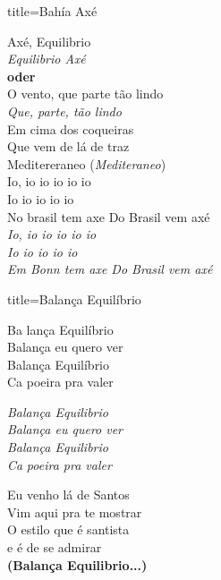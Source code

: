 \documentclass[fontsize=14pt, paper=a4, twoside, DIV=20]{scrreprt} %
\begin{document}
\begin{multicols*}{2}
\begin{song}{title={Bahía Axé}}
\begin{verse*}
        Axé, Equilibrio \\
        \textit{Equilibrio Axé} \\ 
        \textbf{oder} \\
        O vento, que parte tão lindo\\
        \textit{Que, parte, tão lindo}\\
        Em cima dos coqueiras\\
        Que vem de lá de traz\\
        Meditereraneo (\textit{Mediteraneo})\\
        Io, io io io io io\\
        Io io io io io\\
        No brasil tem axe Do Brasil vem axé\\
        \textit{Io, io io io io io}\\
        \textit{Io io io io io}\\
        \textit{Em Bonn tem axe Do Brasil vem axé}\\

    \end{verse*}
\end{song}


\begin{song}{title={Balança Equilíbrio}}
    \begin{verse*}
        Ba lança Equilíbrio\\
        Balança eu quero ver\\
        Balança Equilíbrio\\
        Ca poeira pra valer\\

        \begin{chorus*}
        \textit{Balança Equilibrio}\\
        \textit{Balança eu quero ver}\\
        \textit{Balança Equilibrio}\\
        \textit{Ca} \textit{poeira pra valer}\\
        \end{chorus*}
        
        Eu venho lá de Santos\\
        Vim aqui pra te mostrar\\
        O estilo que é santista\\
        e é de se admirar\\
        \textbf{(Balança Equilibrio...)}\\


\end{verse*}
\end{song}
\end{multicols*}
\end{document}
